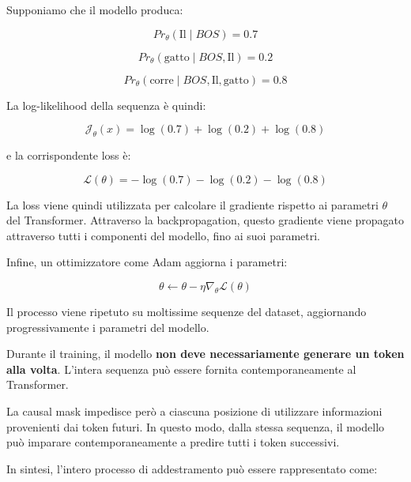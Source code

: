 Supponiamo che il modello produca:

\begin{equation}
Pr_\theta(\text{Il}\mid BOS)=0.7
\end{equation}

\begin{equation}
Pr_\theta(\text{gatto}\mid BOS,\text{Il})=0.2
\end{equation}

\begin{equation}
Pr_\theta(\text{corre}\mid BOS,\text{Il},\text{gatto})=0.8
\end{equation}

La log-likelihood della sequenza è quindi:

\begin{equation}
\mathcal{J}_\theta(x)
=
\log(0.7)+\log(0.2)+\log(0.8)
\end{equation}

e la corrispondente loss è:

\begin{equation}
\mathcal{L}(\theta)
=
-\log(0.7)-\log(0.2)-\log(0.8)
\end{equation}

La loss viene quindi utilizzata per calcolare il gradiente rispetto
ai parametri $\theta$ del Transformer. Attraverso la backpropagation,
questo gradiente viene propagato attraverso tutti i componenti del
modello, fino ai suoi parametri.

Infine, un ottimizzatore come Adam aggiorna i parametri:

\begin{equation}
\theta
\leftarrow
\theta-\eta\nabla_\theta\mathcal{L}(\theta)
\end{equation}

Il processo viene ripetuto su moltissime sequenze del dataset,
aggiornando progressivamente i parametri del modello.

\begin{warning}
Durante il training, il modello \textbf{non deve necessariamente
generare un token alla volta}. L'intera sequenza può essere fornita
contemporaneamente al Transformer.

La causal mask impedisce però a ciascuna posizione di utilizzare
informazioni provenienti dai token futuri. In questo modo, dalla stessa
sequenza, il modello può imparare contemporaneamente a predire tutti
i token successivi.
\end{warning}

In sintesi, l'intero processo di addestramento può essere rappresentato
come:

